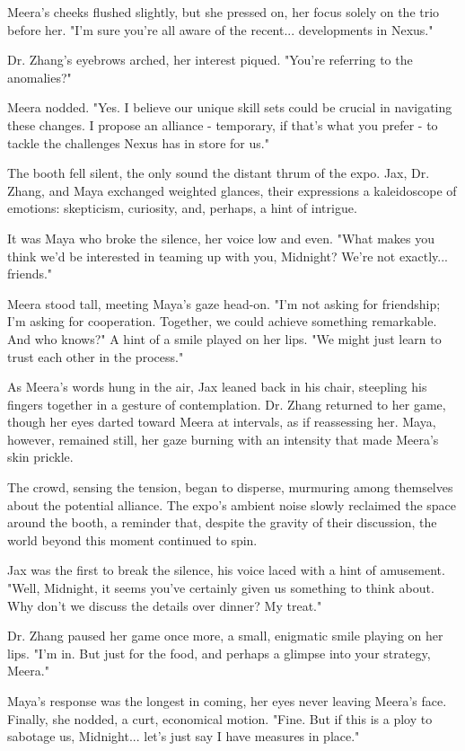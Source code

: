 \documentclass[12pt]{report}  %
\begin{document}
Meera's cheeks flushed slightly, but she pressed on, her focus solely on
the trio before her. "I'm sure you're all aware of the recent...
developments in Nexus."

Dr. Zhang's eyebrows arched, her interest piqued. "You're referring to
the anomalies?"

Meera nodded. "Yes. I believe our unique skill sets could be crucial in
navigating these changes. I propose an alliance - temporary, if that's
what you prefer - to tackle the challenges Nexus has in store for us."

The booth fell silent, the only sound the distant thrum of the expo.
Jax, Dr. Zhang, and Maya exchanged weighted glances, their expressions a
kaleidoscope of emotions: skepticism, curiosity, and, perhaps, a hint of
intrigue.

It was Maya who broke the silence, her voice low and even. "What makes
you think we'd be interested in teaming up with you, Midnight? We're not
exactly... friends."

Meera stood tall, meeting Maya's gaze head-on. "I'm not asking for
friendship; I'm asking for cooperation. Together, we could achieve
something remarkable. And who knows?" A hint of a smile played on her
lips. "We might just learn to trust each other in the process."

As Meera's words hung in the air, Jax leaned back in his chair,
steepling his fingers together in a gesture of contemplation. Dr. Zhang
returned to her game, though her eyes darted toward Meera at intervals,
as if reassessing her. Maya, however, remained still, her gaze burning
with an intensity that made Meera's skin prickle.

The crowd, sensing the tension, began to disperse, murmuring among
themselves about the potential alliance. The expo's ambient noise slowly
reclaimed the space around the booth, a reminder that, despite the
gravity of their discussion, the world beyond this moment continued to
spin.

Jax was the first to break the silence, his voice laced with a hint of
amusement. "Well, Midnight, it seems you've certainly given us something
to think about. Why don't we discuss the details over dinner? My treat."

Dr. Zhang paused her game once more, a small, enigmatic smile playing on
her lips. "I'm in. But just for the food, and perhaps a glimpse into
your strategy, Meera."

Maya's response was the longest in coming, her eyes never leaving
Meera's face. Finally, she nodded, a curt, economical motion. "Fine. But
if this is a ploy to sabotage us, Midnight... let's just say I have
measures in place."
\end{document}
